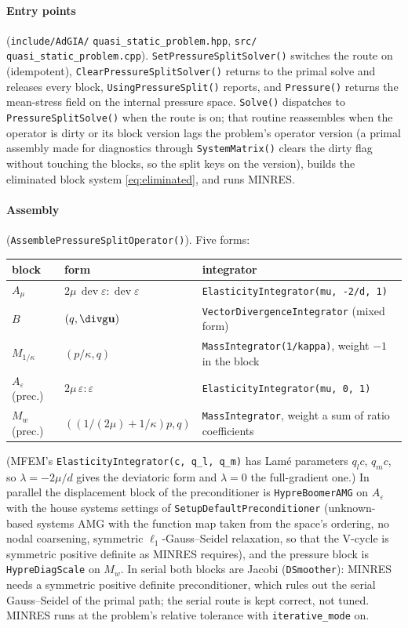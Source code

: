 \documentclass[11pt]{article}
\numberwithin{equation}{section}
\theoremstyle{remark}
\newcommand{\eps}{\varepsilon}
\newcommand{\dev}{\operatorname{dev}}
\newcommand{\vu}{\mathbf{u}}
\newcommand{\Ae}{A_{\eps}}
\newcommand{\Amu}{A_{\mu}}
\newcommand{\Mk}{M_{1/\kappa}}
\newcommand{\Mw}{M_{w}}
\newcommand{\code}[1]{\texttt{#1}}
\begin{document}
\paragraph{Entry points} (\code{include/AdGIA/}\allowbreak
\code{quasi\_static\_problem.hpp}, \code{src/}\allowbreak
\code{quasi\_static\_problem.cpp}).
\code{SetPressureSplitSolver()} switches the route on (idempotent),
\code{ClearPressureSplitSolver()} returns to the primal solve and releases
every block, \code{UsingPressureSplit()} reports, and \code{Pressure()}
returns the mean-stress field on the internal pressure space.
\code{Solve()} dispatches to \code{PressureSplitSolve()} when the route is
on; that routine reassembles when the operator is dirty or its block
version lags the problem's operator version (a primal assembly made for
diagnostics through \code{SystemMatrix()} clears the dirty flag without
touching the blocks, so the split keys on the version), builds the
eliminated block system \eqref{eq:eliminated}, and runs MINRES.

\paragraph{Assembly} (\code{AssemblePressureSplitOperator()}). Five forms:
\begin{center}
\small
\begin{tabular}{@{}lll@{}}
\toprule
block & form & integrator \\
\midrule
$\Amu$ & $2\mu\,\dev\eps:\dev\eps$ & \code{ElasticityIntegrator(mu, -2/d, 1)} \\
$B$ & $(q,\divg\vu)$ & \code{VectorDivergenceIntegrator} (mixed form) \\
$\Mk$ & $(p/\kappa,q)$ & \code{MassIntegrator(1/kappa)}, weight $-1$ in the block \\
$\Ae$ (prec.) & $2\mu\,\eps:\eps$ & \code{ElasticityIntegrator(mu, 0, 1)} \\
$\Mw$ (prec.) & $((1/(2\mu) + 1/\kappa)p,q)$ & \code{MassIntegrator}, weight a sum of ratio coefficients \\
\bottomrule
\end{tabular}
\end{center}
(MFEM's \code{ElasticityIntegrator(c, q\_l, q\_m)} has Lamé parameters
$q_l c$, $q_m c$, so $\lambda = -2\mu/d$ gives the deviatoric form and
$\lambda = 0$ the full-gradient one.) In parallel the displacement block
of the preconditioner is \code{HypreBoomerAMG} on $\Ae$ with the house
systems settings of \code{SetupDefaultPreconditioner} (unknown-based
systems AMG with the function map taken from the space's ordering, no
nodal coarsening, symmetric $\ell_1$-Gauss--Seidel relaxation, so that
the V-cycle is symmetric positive definite as MINRES requires), and the pressure block is
\code{HypreDiagScale} on $\Mw$. In serial both blocks are Jacobi
(\code{DSmoother}): MINRES needs a symmetric positive definite
preconditioner, which rules out the serial Gauss--Seidel of the primal
path; the serial route is kept correct, not tuned. MINRES runs at the
problem's relative tolerance with \code{iterative\_mode} on.
\end{document}
